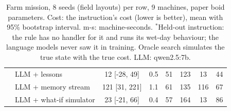 \begin{table}[h!]
{\begin{tabular}{llcccccc}
 & LLM + lessons & 12 [-28, 49] & 0.5 & 51 & 123 & 13 & 44 \\
 & LLM + memory stream & 121 [31, 221] & 1.1 & 61 & 135 & 116 & 67 \\
 & LLM + what-if simulator & 23 [-21, 66] & 0.4 & 57 & 164 & 13 & 86 \\
\hline
\end{tabular}}
\caption{Farm mission, 8 seeds (field layouts) per row, 9 machines, paper boid parameters. Cost: the instruction's cost (lower is better), mean with 95\% bootstrap interval. m-s: machine-seconds. $^*$Held-out instruction: the rule has no handler for it and runs its wet-day behaviour; the language models never saw it in training. Oracle search simulates the true state with the true cost. LLM: qwen2.5:7b.}
\label{tab:farm}
\end{table}
